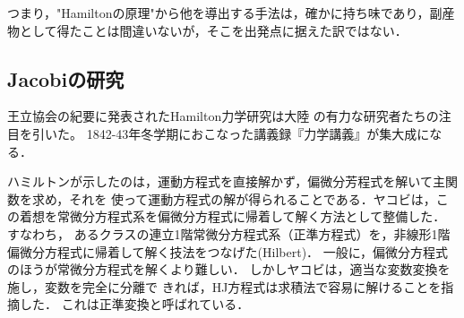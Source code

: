 \documentclass[uplatex,dvipdfmx]{jsreport}
\begin{document}
\begin{remarks}
    つまり，"Hamiltonの原理"から他を導出する手法は，確かに持ち味であり，副産物として得たことは間違いないが，そこを出発点に据えた訳ではない．
\end{remarks}

\subsection{Jacobiの研究}

\begin{tcolorbox}[colframe=ForestGreen, colback=ForestGreen!10!white,breakable,colbacktitle=ForestGreen!40!white,coltitle=black,fonttitle=\bfseries\sffamily,
title=]
    王立協会の紀要に発表されたHamilton力学研究は大陸
    の有力な研究者たちの注目を引いた。
    1842-43年冬学期におこなった講義録『力学講義』が集大成になる．

    ハミルトンが示したのは，運動方程式を直接解かず，偏微分芳程式を解いて主関数を求め，それを
    使って運動方程式の解が得られることである．ヤコビは，この着想を常微分方程式系を偏微分方程式に帰着して解く方法として整備した．
    すなわち，
    あるクラスの連立1階常微分方程式系（正準方程式）を，非線形1階偏微分方程式に帰着して解く技法をつなげた(Hilbert\cite{Hilbert37})．
    一般に，偏微分方程式のほうが常微分方程式を解くより難しい．
    しかしヤコビは，適当な変数変換を施し，変数を完全に分離で
    きれば，HJ方程式は求積法で容易に解けることを指摘した．
    これは正準変換と呼ばれている．
\end{tcolorbox}
\end{document}
